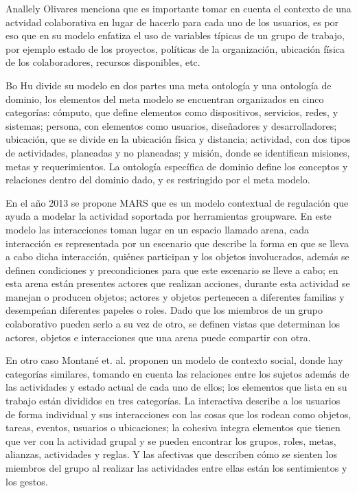 Anallely Olivares \cite{olivares2011} menciona que es importante tomar en cuenta el contexto de una actvidad colaborativa en lugar de hacerlo para cada uno de los usuarios, es por eso que en su modelo enfatiza el uso de variables t\'ipicas de un grupo de trabajo, por ejemplo estado de los proyectos, pol\'iticas de la organizaci\'on, ubicaci\'on f\'isica de los colaboradores, recursos disponibles, etc.

Bo Hu \cite{bohu2013} divide su modelo en dos partes una meta ontolog\'ia y una ontolog\'ia de dominio,  los elementos del meta modelo se encuentran organizados en cinco categor\'ias: c\'omputo, que define elementos como dispositivos, servicios, redes, y sistemas; persona, con elementos como usuarios, dise\~nadores y desarrolladores; ubicaci\'on, que se divide en la ubicaci\'on f\'isica y distancia; actividad, con dos tipos de actividades, planeadas y no planeadas; y misi\'on, donde se identifican misiones, metas y requerimientos. La ontolog\'ia espec\'ifica de dominio define los conceptos y relaciones dentro del dominio dado, y es restringido por el meta modelo.

En el a\~no 2013 se propone MARS que es un modelo contextual de regulaci\'on que ayuda a modelar la actividad soportada por herramientas groupware. En este modelo las interacciones toman lugar en un espacio llamado arena, cada interacci\'on es representada por un escenario que describe la forma en que se lleva a cabo dicha interacci\'on, qui\'enes participan y los objetos involucrados, adem\'as se definen condiciones y precondiciones para que este escenario se lleve a cabo; en esta arena est\'an presentes actores que realizan acciones, durante esta actividad se manejan o producen objetos; actores y objetos pertenecen a diferentes familias y desempe\'nan diferentes papeles o roles. Dado que los miembros de un grupo colaborativo pueden serlo a su vez de otro, se definen vistas que determinan los actores, objetos e interacciones que una arena puede compartir con otra.

En otro caso Montan\'e et. al. proponen un modelo de contexto social\cite{montane2013context}, donde hay categor\'ias similares, tomando en cuenta las relaciones entre los sujetos adem\'as de las actividades y estado actual de cada uno de ellos; los elementos que lista en su trabajo est\'an divididos en tres categor\'ias. La interactiva describe a los usuarios de forma individual y sus interacciones con las cosas que los rodean como objetos, tareas, eventos, usuarios o ubicaciones; la cohesiva integra elementos que tienen que ver con la actividad grupal y se pueden encontrar los grupos, roles, metas, alianzas, actividades y reglas. Y las afectivas que describen c\'omo se sienten los miembros del grupo al realizar las actividades entre ellas est\'an los sentimientos y los gestos.	

